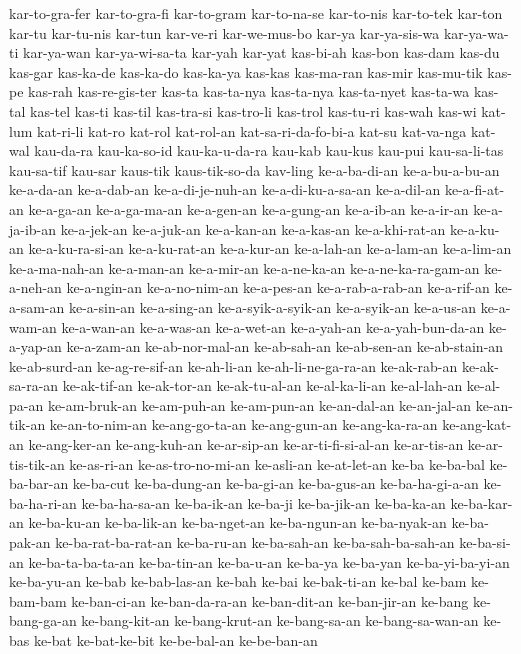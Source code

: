 {kar-to-gra-fer kar-to-gra-fi kar-to-gram kar-to-na-se kar-to-nis
kar-to-tek kar-ton kar-tu kar-tu-nis kar-tun kar-ve-ri kar-we-mus-bo
kar-ya kar-ya-sis-wa kar-ya-wa-ti kar-ya-wan kar-ya-wi-sa-ta kar-yah
kar-yat kas-bi-ah kas-bon kas-dam kas-du kas-gar kas-ka-de kas-ka-do
kas-ka-ya kas-kas kas-ma-ran kas-mir kas-mu-tik kas-pe kas-rah
kas-re-gis-ter kas-ta kas-ta-nya kas-ta-nya kas-ta-nyet kas-ta-wa kas-tal
kas-tel kas-ti kas-til kas-tra-si kas-tro-li kas-trol kas-tu-ri kas-wah
kas-wi kat-lum kat-ri-li kat-ro kat-rol kat-rol-an kat-sa-ri-da-fo-bi-a
kat-su kat-va-nga kat-wal kau-da-ra kau-ka-so-id kau-ka-u-da-ra kau-kab
kau-kus kau-pui kau-sa-li-tas kau-sa-tif kau-sar kaus-tik kaus-tik-so-da
kav-ling ke-a-ba-di-an ke-a-bu-a-bu-an ke-a-da-an ke-a-dab-an
ke-a-di-je-nuh-an ke-a-di-ku-a-sa-an ke-a-dil-an ke-a-fi-at-an ke-a-ga-an
ke-a-ga-ma-an ke-a-gen-an ke-a-gung-an ke-a-ib-an ke-a-ir-an ke-a-ja-ib-an
ke-a-jek-an ke-a-juk-an ke-a-kan-an ke-a-kas-an ke-a-khi-rat-an ke-a-ku-an
ke-a-ku-ra-si-an ke-a-ku-rat-an ke-a-kur-an ke-a-lah-an ke-a-lam-an
ke-a-lim-an ke-a-ma-nah-an ke-a-man-an ke-a-mir-an ke-a-ne-ka-an
ke-a-ne-ka-ra-gam-an ke-a-neh-an ke-a-ngin-an ke-a-no-nim-an ke-a-pes-an
ke-a-rab-a-rab-an ke-a-rif-an ke-a-sam-an ke-a-sin-an ke-a-sing-an
ke-a-syik-a-syik-an ke-a-syik-an ke-a-us-an ke-a-wam-an ke-a-wan-an
ke-a-was-an ke-a-wet-an ke-a-yah-an ke-a-yah-bun-da-an ke-a-yap-an
ke-a-zam-an ke-ab-nor-mal-an ke-ab-sah-an ke-ab-sen-an ke-ab-stain-an
ke-ab-surd-an ke-ag-re-sif-an ke-ah-li-an ke-ah-li-ne-ga-ra-an
ke-ak-rab-an ke-ak-sa-ra-an ke-ak-tif-an ke-ak-tor-an ke-ak-tu-al-an
ke-al-ka-li-an ke-al-lah-an ke-al-pa-an ke-am-bruk-an ke-am-puh-an
ke-am-pun-an ke-an-dal-an ke-an-jal-an ke-an-tik-an ke-an-to-nim-an
ke-ang-go-ta-an ke-ang-gun-an ke-ang-ka-ra-an ke-ang-kat-an ke-ang-ker-an
ke-ang-kuh-an ke-ar-sip-an ke-ar-ti-fi-si-al-an ke-ar-tis-an
ke-ar-tis-tik-an ke-as-ri-an ke-as-tro-no-mi-an ke-asli-an ke-at-let-an
ke-ba ke-ba-bal ke-ba-bar-an ke-ba-cut ke-ba-dung-an ke-ba-gi-an
ke-ba-gus-an ke-ba-ha-gi-a-an ke-ba-ha-ri-an ke-ba-ha-sa-an ke-ba-ik-an
ke-ba-ji ke-ba-jik-an ke-ba-ka-an ke-ba-kar-an ke-ba-ku-an ke-ba-lik-an
ke-ba-nget-an ke-ba-ngun-an ke-ba-nyak-an ke-ba-pak-an ke-ba-rat-ba-rat-an
ke-ba-ru-an ke-ba-sah-an ke-ba-sah-ba-sah-an ke-ba-si-an ke-ba-ta-ba-ta-an
ke-ba-tin-an ke-ba-u-an ke-ba-ya ke-ba-yan ke-ba-yi-ba-yi-an ke-ba-yu-an
ke-bab ke-bab-las-an ke-bah ke-bai ke-bak-ti-an ke-bal ke-bam ke-bam-bam
ke-ban-ci-an ke-ban-da-ra-an ke-ban-dit-an ke-ban-jir-an ke-bang
ke-bang-ga-an ke-bang-kit-an ke-bang-krut-an ke-bang-sa-an
ke-bang-sa-wan-an ke-bas ke-bat ke-bat-ke-bit ke-be-bal-an ke-be-ban-an
}
